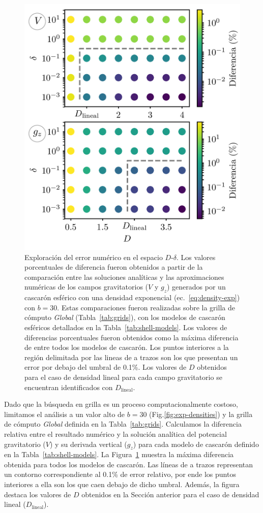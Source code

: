 \begin{figure}[!t]
\centering
\includegraphics[width=0.5\linewidth]{figs/tesseroids-variable-density/grid-search.png}
\caption{
    Exploración del error numérico en el espacio $D$-$\delta$.
    Los valores porcentuales de diferencia fueron obtenidos a partir de la
    comparación entre las soluciones analíticas y las aproximaciones numéricas
    de los campos gravitatorios ($V$ y $g_z$) generados por un cascarón
    esférico con una densidad exponencial
    (ec.~\ref{eq:density-exp}) con $b=30$.
    Estas comparaciones fueron realizadas sobre la grilla de cómputo
    \emph{Global} (Tabla~\ref{tab:grids}), con los modelos de cascarón
    esféricos detallados en la Tabla~\ref{tab:shell-models}.
    Los valores de diferencias porcentuales fueron obtenidos como la máxima
    diferencia de entre todos los modelos de cascarón.
    Los puntos interiores a la región delimitada por las lineas de a trazos son
    los que presentan un error por debajo del umbral de 0.1\%.
    Los valores de $D$ obtenidos para el caso de densidad lineal para cada
    campo gravitatorio se encuentran identificados con $D_\text{lineal}$.
    }
\label{fig:grid-search}
\end{figure}

Dado que la búsqueda en grilla es un proceso computacionalmente costoso,
limitamos el análisis a un valor alto de $b=30$ (Fig.\ref{fig:exp-densities})
y la grilla de cómputo \emph{Global} definida en la Tabla~\ref{tab:grids}.
Calculamos la diferencia relativa entre el resultado numérico y la solución
analítica del potencial gravitatorio ($V$) y su derivada vertical ($g_z$) para
cada modelo de cascarón definido en la Tabla~\ref{tab:shell-models}.
La Figura~\ref{fig:grid-search} muestra la máxima diferencia obtenida para
todos los modelos de cascarón.
Las líneas de a trazos representan un contorno correspondiente al 0.1\% de
error relativo, por ende los puntos interiores a ella son los que caen debajo
de dicho umbral.
Además, la figura destaca los valores de $D$ obtenidos en la Sección anterior
para el caso de densidad lineal ($D_\text{lineal}$).


